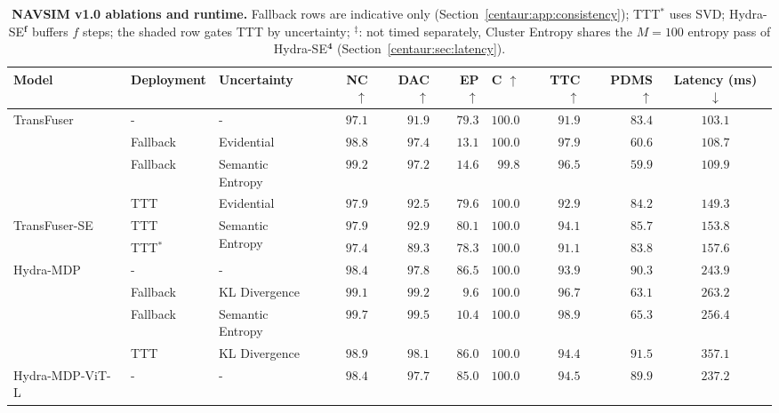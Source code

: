 \begin{table}[tbp]
  \centering
  \caption[NAVSIM v1.0 ablations and runtime]{\textbf{NAVSIM v1.0 ablations and runtime.} Fallback rows are indicative only (Section~\ref{centaur:app:consistency}); TTT$^{*}$ uses SVD; Hydra-SE$^{\mathbf{f}}$ buffers $f$ steps; the shaded row gates TTT by uncertainty; $^{\ddagger}$: not timed separately, Cluster Entropy shares the $M=100$ entropy pass of Hydra-SE$^{\mathbf{4}}$ (Section~\ref{centaur:sec:latency}).}
  \label{centaur:tab:navtest_ablation_supp}
  \footnotesize\begin{adjustbox}{max width=\textwidth}
  \begin{tabular}{l|ll|rrrr|rr|c}
    \toprule
    \textbf{Model} & \textbf{Deployment} & \textbf{Uncertainty} & \textbf{NC} $\uparrow$ & \textbf{DAC} $\uparrow$ & \textbf{EP} $\uparrow$ & \textbf{C} $\uparrow$ & \textbf{TTC} $\uparrow$ & \textbf{PDMS} $\uparrow$ & \textbf{Latency (ms)} $\downarrow$ \\
    \midrule
    \multirow{4}{*}{TransFuser~\cite{chitta2023transfuser}} & - & - & $97.1$ & $91.9$ & $79.3$ & $100.0$ & $91.9$ & $83.4$ & $103.1$ \\
    & Fallback & Evidential & $98.8$ & $97.4$ & $13.1$ & $100.0$ & $97.9$ & $60.6$ & $108.7$ \\
    & Fallback & Semantic Entropy & $99.2$ & $97.2$ & $14.6$ & $99.8$ & $96.5$ & $59.9$ & $109.9$ \\
    & TTT & Evidential & $97.9$ & $92.5$ & $79.6$ & $100.0$ & $92.9$ & $84.2$ & $149.3$ \\
    \midrule
    \multirow{2}{*}{TransFuser-SE} & TTT & \multirow{2}{*}{Semantic Entropy} & $97.9$ & $92.9$ & $80.1$ & $100.0$ & $94.1$ & $85.7$ & $153.8$ \\
    & TTT$^{*}$ & & $97.4$ & $89.3$ & $78.3$ & $100.0$ & $91.1$ & $83.8$ & $157.6$ \\
    \midrule
    \multirow{4}{*}{Hydra-MDP~\cite{li2024hydramdp}} & - & - & $98.4$ & $97.8$ & $86.5$ & $100.0$ & $93.9$ & $90.3$ & $243.9$ \\
    & Fallback & KL Divergence & $99.1$ & $99.2$ & $9.6$ & $100.0$ & $96.7$ & $63.1$ & $263.2$ \\
    & Fallback & Semantic Entropy & $99.7$ & $99.5$ & $10.4$ & $100.0$ & $98.9$ & $65.3$ & $256.4$ \\
    & TTT & KL Divergence & $98.9$ & $98.1$ & $86.0$ & $100.0$ & $94.4$ & $91.5$ & $357.1$ \\
    \midrule
    \multirow{4}{*}{Hydra-MDP-ViT-L} & - & - & $98.4$ & $97.7$ & $85.0$ & $100.0$ & $94.5$ & $89.9$ & $237.2$ \\

\end{tabular}
\end{adjustbox}
\end{table}

